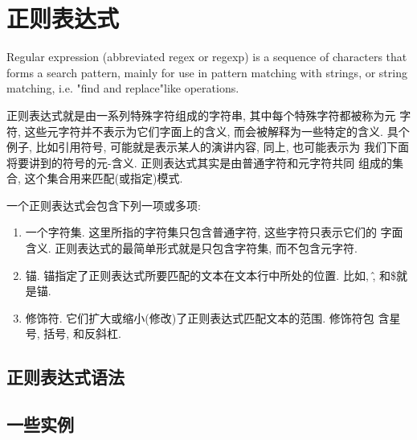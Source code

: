 \chapter{正则表达式}

Regular expression (abbreviated regex or
regexp) is a sequence of characters that forms a search pattern,
mainly for use in pattern matching with strings, or string matching,
i.e. "find and replace"\-like operations.

正则表达式就是由一系列特殊字符组成的字符串, 其中每个特殊字符都被称为元
字符, 这些元字符并不表示为它们字面上的含义, 而会被解释为一些特定的含义.
具个例子, 比如引用符号, 可能就是表示某人的演讲内容, 同上, 也可能表示为
我们下面将要讲到的符号的元-含义. 正则表达式其实是由普通字符和元字符共同
组成的集合, 这个集合用来匹配(或指定)模式.

一个正则表达式会包含下列一项或多项:

\begin{enumerate}[itemsep=0pt,parsep=0pt]
\item 一个字符集. 这里所指的字符集只包含普通字符, 这些字符只表示它们的
  字面含义. 正则表达式的最简单形式就是只包含字符集, 而不包含元字符.
\item 锚. 锚指定了正则表达式所要匹配的文本在文本行中所处的位置. 比如,
  \^, 和\$就是锚.
\item 修饰符. 它们扩大或缩小(修改)了正则表达式匹配文本的范围. 修饰符包
  含星号, 括号, 和反斜杠.
\end{enumerate}

\section{正则表达式语法}

\section{一些实例}
